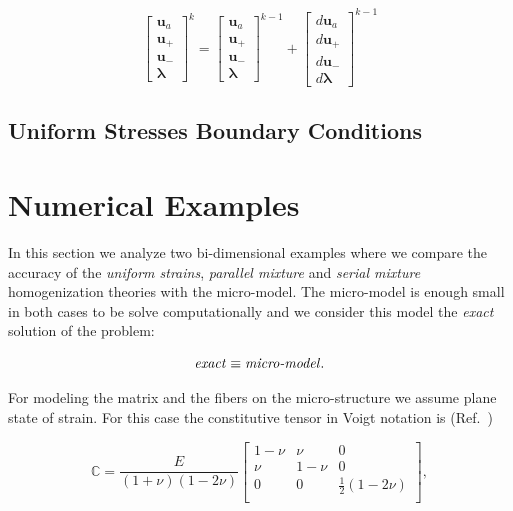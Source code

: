 \documentclass[3p]{elsarticle}
\begin{document}
\begin{equation}
\begin{bmatrix}
\bm{u}_a \\
\bm{u}_+ \\
\bm{u}_- \\
\bm{\lambda}
\end{bmatrix}^{k}
= 
\begin{bmatrix}
\bm{u}_a \\
\bm{u}_+ \\
\bm{u}_- \\
\bm{\lambda}
\end{bmatrix}^{k-1}
+
\begin{bmatrix}
d\bm{u}_a \\
d\bm{u}_+ \\
d\bm{u}_- \\
d\bm{\lambda}
\end{bmatrix}^{k-1}
\end{equation}

\subsection{Uniform Stresses Boundary Conditions}


\section{Numerical Examples}

In this section we analyze two bi-dimensional examples where we compare the accuracy of
the \emph{uniform strains}, \emph{parallel mixture} and \emph{serial mixture}
homogenization theories with the micro-model. The micro-model is enough small in
both cases to be solve computationally and we consider this model the
\emph{exact} solution of the problem:

$$\text{\emph{exact}} \equiv \text{\emph{micro-model}}.$$

For modeling the matrix and the fibers on the micro-structure we assume plane
state of strain. For this case the constitutive tensor in Voigt notation is 
(Ref.~\cite{chavez_continuo})

\begin{equation}
\mathbb{C} = 
\frac{E}{(1+\nu)(1-2\nu)}
  \begin{bmatrix}
  1-\nu    & \nu      & 0                  \\
  \nu      & 1-\nu    & 0                  \\
  0        & 0        & \frac{1}{2}(1-2\nu)\\
  \end{bmatrix},
\end{equation}
\end{document}

